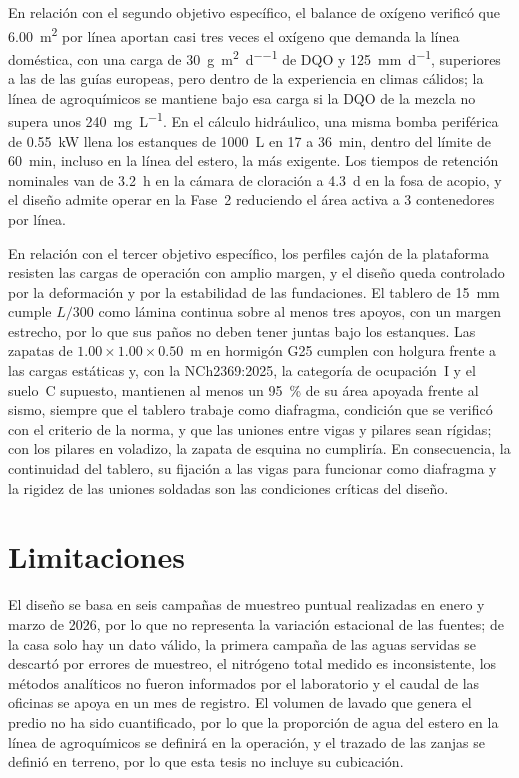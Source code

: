 En relación con el segundo objetivo específico, el balance de oxígeno verificó que \qty{6.00}{\square\meter} por línea aportan casi tres veces el oxígeno que demanda la línea doméstica, con una carga de \qty{30}{\gram\per\square\meter\per\day} de DQO y \qty{125}{\milli\meter\per\day}, superiores a las de las guías europeas, pero dentro de la experiencia en climas cálidos; la línea de agroquímicos se mantiene bajo esa carga si la DQO de la mezcla no supera unos \qty{240}{\milli\gram\per\liter}.
En el cálculo hidráulico, una misma bomba periférica de \qty{0.55}{\kilo\watt} llena los estanques de \qty{1000}{\liter} en 17 a \qty{36}{\minute}, dentro del límite de \qty{60}{\minute}, incluso en la línea del estero, la más exigente.
Los tiempos de retención nominales van de \qty{3.2}{\hour} en la cámara de cloración a \qty{4.3}{\day} en la fosa de acopio, y el diseño admite operar en la Fase~2 reduciendo el área activa a 3 contenedores por línea.

En relación con el tercer objetivo específico, los perfiles cajón de la plataforma resisten las cargas de operación con amplio margen, y el diseño queda controlado por la deformación y por la estabilidad de las fundaciones.
El tablero de \qty{15}{\milli\meter} cumple $L/300$ como lámina continua sobre al menos tres apoyos, con un margen estrecho, por lo que sus paños no deben tener juntas bajo los estanques.
Las zapatas de $\num{1.00} \times \num{1.00} \times \num{0.50}$~\unit{\meter} en hormigón G25 cumplen con holgura frente a las cargas estáticas y, con la NCh2369:2025, la categoría de ocupación~I y el suelo~C supuesto, mantienen al menos un \qty{95}{\percent} de su área apoyada frente al sismo, siempre que el tablero trabaje como diafragma, condición que se verificó con el criterio de la norma, y que las uniones entre vigas y pilares sean rígidas; con los pilares en voladizo, la zapata de esquina no cumpliría.
En consecuencia, la continuidad del tablero, su fijación a las vigas para funcionar como diafragma y la rigidez de las uniones soldadas son las condiciones críticas del diseño.

\section{Limitaciones}
\label{sec:limitaciones}

El diseño se basa en seis campañas de muestreo puntual realizadas en enero y marzo de 2026, por lo que no representa la variación estacional de las fuentes; de la casa solo hay un dato válido, la primera campaña de las aguas servidas se descartó por errores de muestreo, el nitrógeno total medido es inconsistente, los métodos analíticos no fueron informados por el laboratorio y el caudal de las oficinas se apoya en un mes de registro.
El volumen de lavado que genera el predio no ha sido cuantificado, por lo que la proporción de agua del estero en la línea de agroquímicos se definirá en la operación, y el trazado de las zanjas se definió en terreno, por lo que esta tesis no incluye su cubicación.


